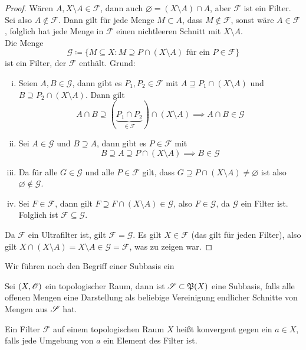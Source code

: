 \begin{proof}
    Wären $A,X\setminus A\in \mathcal{F}$, dann auch $\varnothing = (X\setminus A)\cap A$, aber $\mathcal{F}$ ist ein Filter. Sei also $A\notin \mathcal{F}$. Dann gilt für jede Menge $M\subset A$, dass $M\notin \mathcal{F}$, sonst wäre $A\in \mathcal{F}$, folglich hat jede Menge in $\mathcal{F}$ einen nichtleeren Schnitt mit $X\setminus A$. \\
    Die Menge 
    \[
    \mathcal{G} \coloneqq \{M\subseteq X:M\supseteq P\cap (X\setminus A) \text{ für ein } P\in \mathcal{F}   \}    
    \]
    ist ein Filter, der $\mathcal{F}$ enthält. Grund:
    \begin{enumerate}[(i)]
        \item Seien $A,B\in \mathcal{G}$, dann gibt es $P_1,P_2\in \mathcal{F}$ mit $A\supseteq P_1\cap (X\setminus A)$ und $B\supseteq P_2\cap (X\setminus A)$. Dann gilt
        \[
        A\cap B \supseteq (\underbrace{P_1\cap P_2}_{\in \mathcal{F}}) \cap (X\setminus A) \implies A\cap B \in \mathcal{G}
        \]
        \item Sei $A\in \mathcal{G}$ und $B\supseteq A$, dann gibt es $P\in \mathcal{F}$ mit 
        \[
        B\supseteq A \supseteq P\cap (X\setminus A) \implies B\in \mathcal{G}    
        \] 
        \item Da für alle $G\in \mathcal{G}$ und alle $P\in \mathcal{F}$ gilt, dass $G\supseteq P\cap (X\setminus A) \neq \varnothing$ ist also $\varnothing \notin \mathcal{G}$.
        \item Sei $F\in \mathcal{F}$, dann gilt $F\supseteq F\cap (X\setminus A)\in \mathcal{G}$, also $F\in \mathcal{G}$, da $\mathcal{G}$ ein Filter ist. Folglich ist $\mathcal{F}\subseteq \mathcal{G}$.
    \end{enumerate}
    Da $\mathcal{F}$ ein Ultrafilter ist, gilt $\mathcal{F}=\mathcal{G}$. Es gilt $X\in \mathcal{F}$ (das gilt für jeden Filter), also gilt $X\cap (X\setminus A) = X\setminus A \in \mathcal{G}=\mathcal{F}$, was zu zeigen war.
\end{proof}
Wir führen noch den Begriff einer Subbasis ein 
\begin{defn}
    Sei $(X,\mathscr{O})$ ein topologischer Raum, dann ist $\mathscr{S}\subset \mathfrak{P}(X)$ eine Subbasis, falls alle offenen Mengen eine Darstellung als beliebige Vereinigung endlicher Schnitte von Mengen aus $\mathscr{S}$ hat. 
\end{defn}
\begin{defn}
    Ein Filter $\mathcal{F}$ auf einem topologischen Raum $X$ heißt konvergent gegen ein $a\in X$, falls jede Umgebung von $a$ ein Element des Filter ist.
\end{defn}
